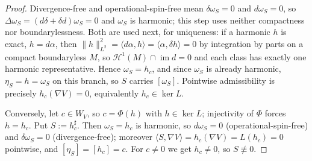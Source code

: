 \documentclass[11pt]{article}
\theoremstyle{definition}
\begin{document}
\begin{proof}
Divergence-free and operational-spin-free mean
\(\delta\omega_S=0\) and \(d\omega_S=0\), so
\(\Delta\omega_S=(d\delta+\delta d)\omega_S=0\) and \(\omega_S\) is
harmonic; this step uses neither compactness nor boundarylessness.  Both
are used next, for uniqueness: if a harmonic \(h\) is exact, \(h=d\alpha\),
then \(\lVert h\rVert^2_{L^2}=\langle d\alpha,h\rangle
=\langle\alpha,\delta h\rangle=0\) by integration by parts on a compact
boundaryless \(M\), so \(\mathcal H^1(M)\cap\operatorname{im}d=0\) and each
class has exactly one harmonic representative.  Hence \(\omega_S=h_c\), and
since \(\omega_S\) is already harmonic, \(\eta_S=h=\omega_S\) on this
branch, so \(S\) carries \([\omega_S]\).  Pointwise admissibility is
precisely \(h_c(\nabla V)=0\), equivalently \(h_c\in\ker L\).

Conversely, let \(c\in W_V\), so \(c=\Phi(h)\) with \(h\in\ker L\);
injectivity of \(\Phi\) forces \(h=h_c\).  Put \(S:=h_c^\sharp\).  Then
\(\omega_S=h_c\) is harmonic, so \(d\omega_S=0\) (operational-spin-free)
and \(\delta\omega_S=0\) (divergence-free); moreover
\(\langle S,\nabla V\rangle=h_c(\nabla V)=L(h_c)=0\) pointwise, and
\([\eta_S]=[h_c]=c\).  For \(c\neq0\) we get \(h_c\neq0\), so
\(S\not\equiv0\).
\end{proof}
\end{document}

